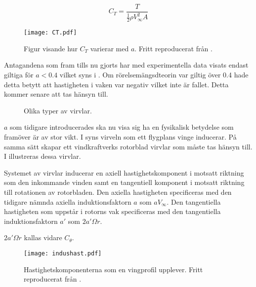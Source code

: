\begin{equation}
\label{CT}C_T = \frac{T}{\frac{1}{2} \rho V^2_{\infty} A}
\end{equation}

\begin{figure}[!htb]
  \centering
  \texttt{[image: CT.pdf]}
  \caption{Figur visande hur $C_T$ varierar med $a$. Fritt reproducerat från \citet{hansen}. }
  \label{CT}
\end{figure}

Antagandena som fram tills nu gjorts har med experimentella data visats endast giltiga för $a < 0.4$ vilket syns i . Om rörelsemängsdteorin var giltig över 0.4 hade detta betytt att hastigheten i vaken var negativ vilket inte är fallet. Detta kommer senare att tas hänsyn till.

\begin{figure}[!htb]
  \centering
  \caption{Olika typer av virvlar.}
  \label{virvlar}
\end{figure}

$a$ som tidigare introducerades ska nu visa sig ha en fysikalisk betydelse som framöver är av stor vikt. I  syns virveln som ett flygplans vinge inducerar. På samma sätt skapar ett vindkraftverks rotorblad virvlar som måste tas hänsyn till. I  illustreras dessa virvlar.

Systemet av virvlar inducerar en axiell hastighetskomponent i motsatt riktning som den inkommande vinden samt en tangentiell komponent i motsatt riktning till rotationen av rotorbladen. Den axiella hastigheten specificeras med den tidigare nämnda axiella induktionsfaktorn $a$ som $a V_{\infty}$. Den tangentiella hastigheten som uppstår i rotorns vak specificeras med den tangentiella induktionsfaktorn $a'$ som $2 a' \Omega r$.

$2 a' \Omega r$ kallas vidare $C_{\theta}$.

\begin{figure}[!htb]
  \centering
  \texttt{[image: indushast.pdf]}
  \caption{Hastighetskomponenterna som en vingprofil upplever. Fritt reproducerat från \citet{hansen}.}
  \label{indushast}
\end{figure}

